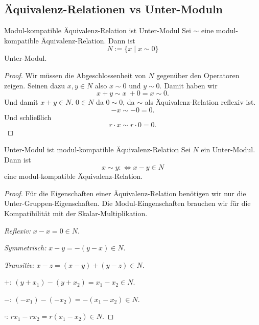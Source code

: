 \documentclass[a4paper]{amsart}
\theoremstyle{definition}
\begin{document}
\subsection{Äquivalenz-Relationen vs Unter-Moduln}
\begin{Satz}{Modul-kompatible Äquivalenz-Relation ist Unter-Modul}
   Sei $\sim$ eine modul-kompatible Äquivalenz-Relation. Dann ist
   \begin{equation}\label{UnterModulZuRelation}
      N := \{ x \mid x \sim 0\}
   \end{equation}
   Unter-Modul.
\end{Satz}
\begin{proof}
   Wir müssen die Abgeschlossenheit von $N$ gegenüber den Operatoren zeigen. Seinen dazu $x, y \in N$ also $x \sim 0$ und $y \sim 0$. Damit haben wir 
   \begin{equation}\label{abgeschlossenPlus}
      x + y \sim x \ + 0 = x \sim 0.
   \end{equation}
   Und damit $x + y \in N$.
   $0 \in N$ da $0 \sim 0$, da $\sim$ als Äquivalenz-Relation reflexiv ist. 
   \begin{equation}\label{abgeschlossenMinus}
      - x \sim - 0 = 0.
   \end{equation}
   Und schließlich
   \begin{equation}\label{abgeschlossenMal}
      r \cdot x \sim r \cdot 0 = 0.
   \end{equation}
\end{proof}

\begin{Satz}{Unter-Modul ist modul-kompatible Äquivalenz-Relation}
   Sei $N$ ein Unter-Modul. Dann ist
   \begin{equation}\label{RelationZuUnterModul}
      x \sim y :\Leftrightarrow x-y \in N
   \end{equation}
   eine modul-kompatible Äquivalenz-Relation.
\end{Satz}
\begin{proof}
   Für die Eigenschaften einer Äquivalenz-Relation benötigen wir nur die Unter-Gruppen-Eigenschaften. Die Modul-Eingenschaften brauchen wir für die Kompatibilität mit der Skalar-Multiplikation.
   
   \emph{Reflexiv:} $x - x = 0 \in N$.
   
   \emph{Symmetrisch:} $x - y = -(y - x) \in N$.
   
   \emph{Transitiv:} $x - z = (x - y) + (y - z) \in N$.

   $+$: $(y + x_1) - (y + x_2) = x_1 - x_2 \in N$.
   
   $-$: $(-x_1) - (-x_2) = -(x_1 - x_2) \in N$.
   
   $\cdot$: $rx_1 - rx_2 = r(x_1 - x_2) \in N$.
\end{proof}
\end{document}
